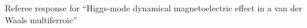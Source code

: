 \documentclass{article}
\begin{document}
\begin{center}
    \Large Referee response for ``Higgs-mode dynamical magnetoelectric effect in a van der Waals multiferroic''
\end{center}




\end{document}
